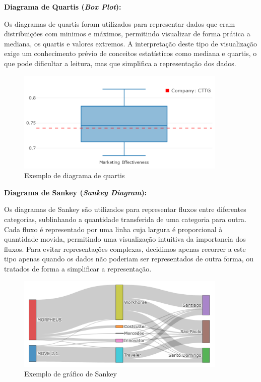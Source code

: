 \textbf{Diagrama de Quartis (\textit{Box Plot}):}

Os diagramas de quartis foram utilizados para representar dados que eram distribuições com minimos e máximos, permitindo visualizar de forma prática a mediana, os quartis e valores extremos.  A interpretação deste tipo de visualização exige um conhecimento prévio de conceitos estatísticos como mediana e quartis, o que pode dificultar a leitura, mas que simplifica a representação dos dados.

\begin{figure}[H]
    \centering
    \includegraphics[max width=10cm]{./img/box}
    \caption{Exemplo de diagrama de quartis}
\end{figure}

\textbf{Diagrama de Sankey (\textit{Sankey Diagram}):}

Os diagramas de Sankey são utilizados para representar fluxos entre diferentes categorias, sublinhando a quantidade transferida de uma categoria para outra. Cada fluxo é representado por uma linha cuja largura é proporcional à quantidade movida, permitindo uma visualização intuitiva da importancia dos fluxos. Para evitar representações complexas, decidimos apenas recorrer a este tipo apenas quando os dados não poderiam ser representados de outra forma, ou tratados de forma a simplificar a representação.

\begin{figure}[H]
    \centering
    \includegraphics[max width=10cm]{./img/skankey}
    \caption{Exemplo de gráfico de Sankey}
\end{figure}

